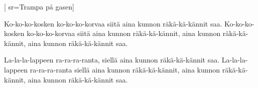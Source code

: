 


[ 	%
	sr={Trampa på gasen}]		%
	
\beginverse*		%
Ko-ko-ko-kosken ko-ko-ko-korvaa
siitä aina kunnon räkä-kä-kännit saa.
Ko-ko-ko-kosken ko-ko-ko-korvaa
siitä aina kunnon räkä-kä-kännit,
aina kunnon räkä-kä-kännit,
aina kunnon räkä-kä-kännit saa.
\endverse			%

\beginverse*
La-la-la-lappeen ra-ra-ra-ranta,
siellä aina kunnon räkä-kä-kännit saa.
La-la-la-lappeen ra-ra-ra-ranta
siellä aina kunnon räkä-kä-kännit,
aina kunnon räkä-kä-kännit,
aina kunnon räkä-kä-kännit saa.
\endverse			%
\endsong			%
